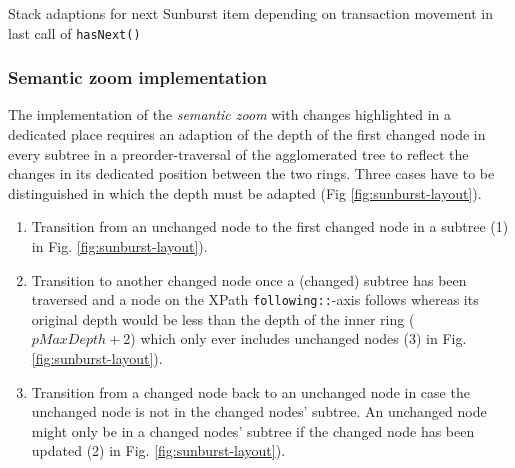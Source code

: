 \begin{algorithm}[Hhtbp]
{}
\BlankLine
{}
\caption{Stack adaptions for next Sunburst item depending on transaction movement in last call of \texttt{hasNext()}}\label{algo:nextitem}
\end{algorithm}

\subsubsection{Semantic zoom implementation}
The implementation of the \emph{semantic zoom} with changes highlighted in a dedicated place requires an adaption of the depth of the first changed node in every subtree in a preorder-traversal of the agglomerated tree to reflect the changes in its dedicated position between the two rings. Three cases have to be distinguished in which the depth must be adapted (Fig \ref{fig:sunburst-layout}).

\begin{enumerate}
\item Transition from an unchanged node to the first changed node in a subtree (1) in Fig. \ref{fig:sunburst-layout}). 
\item Transition to another changed node once a (changed) subtree has been traversed and a node on the XPath \texttt{following::}-axis follows whereas its original depth would be less than the depth of the inner ring ($pMaxDepth + 2$) which only ever includes unchanged nodes (3) in Fig. \ref{fig:sunburst-layout}).
\item Transition from a changed node back to an unchanged node in case the unchanged node is not in the changed nodes' subtree. An unchanged node might only be in a changed nodes' subtree if the changed node has been updated (2) in Fig. \ref{fig:sunburst-layout}).
\end{enumerate}

